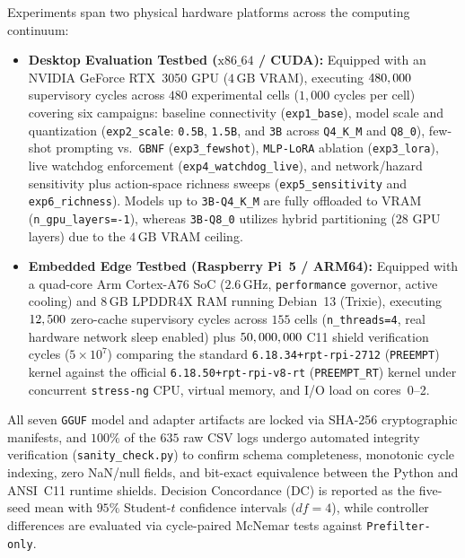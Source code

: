 \documentclass{ieeeaccess}
\begin{document}


Experiments span two physical hardware platforms across the computing continuum:
\begin{itemize}
    \item \textbf{Desktop Evaluation Testbed ($\text{x86\_64}$ / CUDA):} Equipped with an NVIDIA GeForce RTX~3050 GPU ($4\,\text{GB}$ VRAM), executing $480,000$ supervisory cycles across $480$ experimental cells ($1{,}000$ cycles per cell) covering six campaigns: baseline connectivity (\texttt{exp1\_base}), model scale and quantization (\texttt{exp2\_scale}: \texttt{0.5B}, \texttt{1.5B}, and \texttt{3B} across \texttt{Q4\_K\_M} and \texttt{Q8\_0}), few-shot prompting vs.\ \texttt{GBNF} (\texttt{exp3\_fewshot}), \texttt{MLP-LoRA} ablation (\texttt{exp3\_lora}), live watchdog enforcement (\texttt{exp4\_watchdog\_live}), and network/hazard sensitivity plus action-space richness sweeps (\texttt{exp5\_sen\-si\-tiv\-i\-ty} and \texttt{exp6\_rich\-ness}). Models up to \texttt{3B-Q4\_K\_M} are fully offloaded to VRAM (\texttt{n\_gpu\_layers=-1}), whereas \texttt{3B-Q8\_0} utilizes hybrid partitioning ($28$ GPU layers) due to the $4\,\text{GB}$ VRAM ceiling.
    \item \textbf{Embedded Edge Testbed (Raspberry Pi~5 / ARM64):} Equipped with a quad-core Arm Cortex-A76 SoC ($2.6\,\text{GHz}$, \texttt{performance} governor, active cooling) and $8\,\text{GB}$ LPDDR4X RAM running Debian~13 (Trixie), executing $12,500$ zero-cache supervisory cycles across $155$ cells (\texttt{n\_threads=4}, real hardware network sleep enabled) plus $50,000,000$ C11 shield verification cycles ($5 \times 10^7$) comparing the standard \texttt{6.18.34+rpt-rpi-2712} (\texttt{PREEMPT}) kernel against the official \texttt{6.18.50+rpt-rpi-v8-rt} (\texttt{PREEMPT\_RT}) kernel under concurrent \texttt{stress-ng} CPU, virtual memory, and I/O load on cores~0--2.
\end{itemize}

All seven \texttt{GGUF} model and adapter artifacts are locked via SHA-256 cryptographic manifests, and $100\%$ of the $635$ raw CSV logs undergo automated integrity verification (\texttt{sanity\_check.py}) to confirm schema completeness, monotonic cycle indexing, zero NaN/null fields, and bit-exact equivalence between the Python and ANSI~C11 runtime shields. Decision Concordance (\textsc{DC}) is reported as the five-seed mean with $95\%$ Student-$t$ confidence intervals ($df=4$), while controller differences are evaluated via cycle-paired McNemar tests against \texttt{Prefilter-only}.
\end{document}
